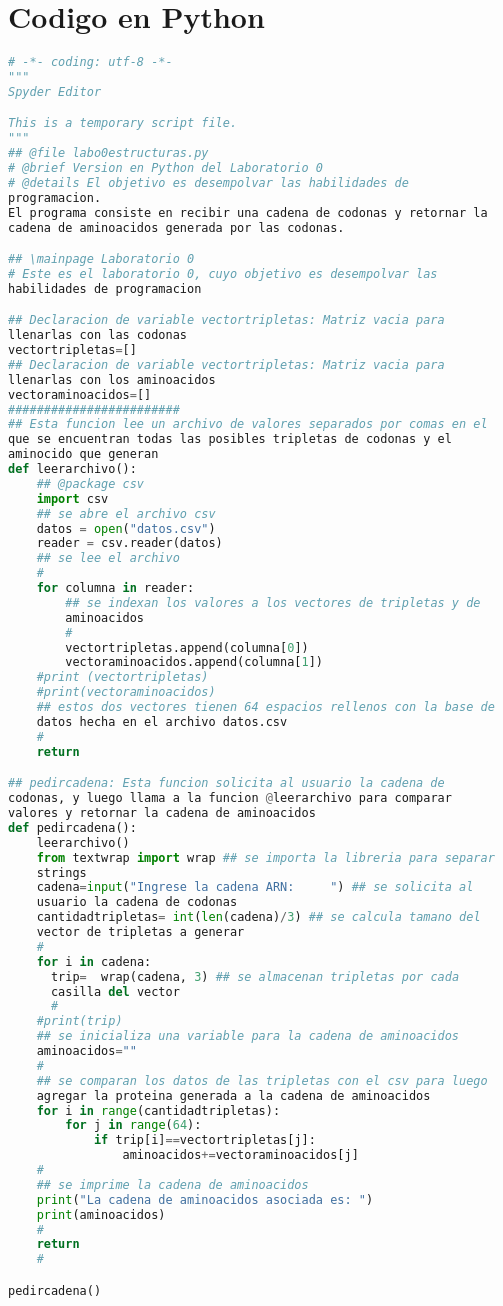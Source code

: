 \documentclass[12pt,letterpaper]{report}
\begin{document}
\section{Codigo en Python}
\begin{lstlisting}[language=Python]
# -*- coding: utf-8 -*-
"""
Spyder Editor

This is a temporary script file.
"""
## @file labo0estructuras.py
# @brief Version en Python del Laboratorio 0
# @details El objetivo es desempolvar las habilidades de
programacion. 
El programa consiste en recibir una cadena de codonas y retornar la 
cadena de aminoacidos generada por las codonas.

## \mainpage Laboratorio 0
# Este es el laboratorio 0, cuyo objetivo es desempolvar las 
habilidades de programacion

## Declaracion de variable vectortripletas: Matriz vacia para 
llenarlas con las codonas
vectortripletas=[]
## Declaracion de variable vectortripletas: Matriz vacia para 
llenarlas con los aminoacidos
vectoraminoacidos=[]
########################
## Esta funcion lee un archivo de valores separados por comas en el 
que se encuentran todas las posibles tripletas de codonas y el 
aminocido que generan
def leerarchivo():
    ## @package csv
    import csv 
    ## se abre el archivo csv
    datos = open("datos.csv") 
    reader = csv.reader(datos) 
    ## se lee el archivo
    #
    for columna in reader:
        ## se indexan los valores a los vectores de tripletas y de 
        aminoacidos
        #
        vectortripletas.append(columna[0])
        vectoraminoacidos.append(columna[1])
    #print (vectortripletas)
    #print(vectoraminoacidos)   
    ## estos dos vectores tienen 64 espacios rellenos con la base de
    datos hecha en el archivo datos.csv
    #
    return

## pedircadena: Esta funcion solicita al usuario la cadena de 
codonas, y luego llama a la funcion @leerarchivo para comparar 
valores y retornar la cadena de aminoacidos
def pedircadena():
    leerarchivo()
    from textwrap import wrap ## se importa la libreria para separar
    strings
    cadena=input("Ingrese la cadena ARN:     ") ## se solicita al 
    usuario la cadena de codonas
    cantidadtripletas= int(len(cadena)/3) ## se calcula tamano del 
    vector de tripletas a generar
    #
    for i in cadena:
      trip=  wrap(cadena, 3) ## se almacenan tripletas por cada 
      casilla del vector
      #
    #print(trip)
    ## se inicializa una variable para la cadena de aminoacidos
    aminoacidos=""
    #
    ## se comparan los datos de las tripletas con el csv para luego 
    agregar la proteina generada a la cadena de aminoacidos
    for i in range(cantidadtripletas):
        for j in range(64):
            if trip[i]==vectortripletas[j]:
                aminoacidos+=vectoraminoacidos[j]
    #
    ## se imprime la cadena de aminoacidos
    print("La cadena de aminoacidos asociada es: ")    
    print(aminoacidos)
    #
    return
    #

pedircadena()


\end{lstlisting}
\end{document}
